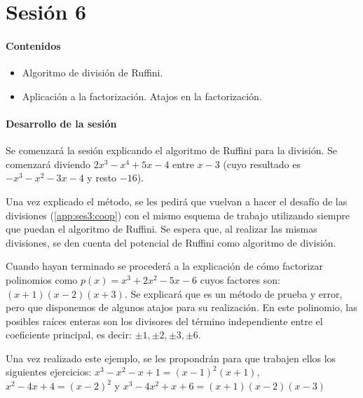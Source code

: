 
\section{Sesión 6}

\paragraph{Contenidos}
\begin{itemize}
	\item Algoritmo de división de Ruffini.
	\item Aplicación a la factorización.
	\subitem Atajos en la factorización.
\end{itemize}

\paragraph{Desarrollo de la sesión}

Se comenzará la sesión explicando el algoritmo de Ruffini para la división. 
%
Se comenzará diviendo $2x^3-x^4+5x-4$ entre $x-3$ (cuyo resultado es $-x^3-x^2-3x-4$ y resto $-16$).

Una vez explicado el método, se les pedirá que vuelvan a hacer el desafío de las divisiones (\ref{app:ses3:coop}) con el mismo esquema de trabajo utilizando siempre que puedan el algoritmo de Ruffini.
%
Se espera que, al realizar las mismas divisiones, se den cuenta del potencial de Ruffini como algoritmo de división.

Cuando hayan terminado se procederá a la explicación de cómo factorizar polinomios como $ p(x) = x^3+2x^2-5x-6$ cuyos factores son: $(x+1)(x-2)(x+3)$. 
%
Se explicará que es un método de prueba y error,  pero que disponemos de algunos atajos para su realización. 
%
En este polinomio, las posibles raíces enteras son los divisores del término independiente entre el coeficiente principal, es decir: $\pm1,\pm2,\pm3,\pm6$.

Una vez realizado este ejemplo, se les propondrán para que trabajen ellos los siguientes ejercicios: $x^3-x^2-x+1 = (x-1)^2(x+1)$, $x^2-4x+4 = (x-2)^2$ y $x^3-4x^2+x+6 = (x+1)(x-2)(x-3)$


